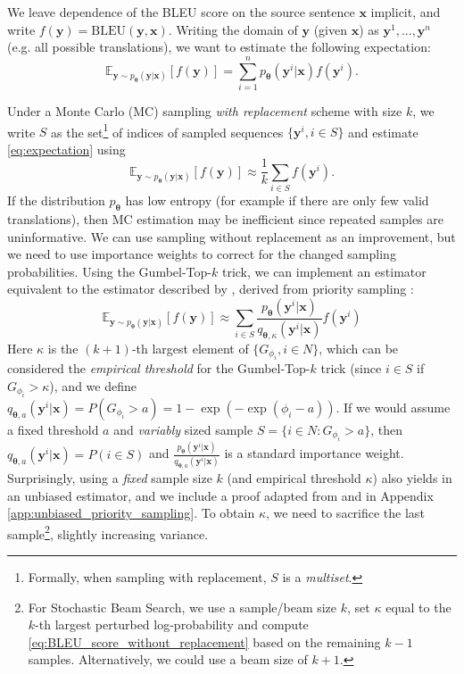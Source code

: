 We leave dependence of the BLEU score on the source sentence $\bm{x}$ implicit, and write $f(\bm{y}) = \text{BLEU}(\bm{y},\bm{x})$. Writing the domain of $\bm{y}$ (given $\bm{x}$) as $\bm{y}^1, ..., \bm{y}^n$ (e.g. all possible translations), we want to estimate the following expectation:
\begin{equation}
\label{eq:expectation}
    \mathbb{E}_{\bm{y} \sim p_{\bm{\theta}}(\bm{y}|\bm{x})} \left[f(\bm{y})\right] = \sum\limits_{i=1}^n p_{\bm{\theta}}(\bm{y}^i|\bm{x}) f(\bm{y}^i).
\end{equation}

Under a Monte Carlo (MC) sampling \emph{with replacement} scheme with size $k$, we write $S$ as the set\footnote{Formally, when sampling with replacement, $S$ is a \emph{multiset}.} of indices of sampled sequences $\{\bm{y}^i, i \in S\}$ and estimate \eqref{eq:expectation} using \begin{equation}
\label{eq:estimate_mc}
    \mathbb{E}_{\bm{y} \sim p_{\bm{\theta}}(\bm{y}|\bm{x})} \left[f(\bm{y})\right] \approx \frac{1}{k} \sum_{i \in S} f(\bm{y}^i).
\end{equation}
If the distribution $p_{\bm{\theta}}$ has low entropy (for example if there are only few valid translations), then MC estimation may be inefficient since repeated samples are uninformative. We can use sampling without replacement as an improvement, but we need to use importance weights to correct for the changed sampling probabilities. Using the Gumbel-Top-$k$ trick, we can implement an estimator equivalent to the estimator described by \citet{vieira2017estimating}, derived from priority sampling \citep{duffield2007priority}:
\begin{equation}
\label{eq:BLEU_score_without_replacement}
    \mathbb{E}_{\bm{y} \sim p_{\bm{\theta}}(\bm{y}|\bm{x})} \left[f(\bm{y})\right] \approx \sum_{i \in S}  \frac{p_{\bm{\theta}}(\bm{y}^i|\bm{x})}{q_{\bm{\theta},\kappa}(\bm{y}^i|\bm{x})}f(\bm{y}^i)
\end{equation}
Here $\kappa$ is the $(k+1)$-th largest element of $\{G_{\phi_i}, i \in N\}$, which can be considered the \emph{empirical threshold} for the Gumbel-Top-$k$ trick (since $i \in S$ if $G_{\phi_i} > \kappa$), and we define $q_{\bm{\theta},a}(\bm{y}^i|\bm{x}) = P(G_{\phi_i} > a) = 1 - \exp (-\exp(\phi_i - a))$.
If we would assume a fixed threshold $a$ and \emph{variably} sized sample $S = \{i \in N: G_{\phi_i} > a\}$, then $q_{\bm{\theta},a}(\bm{y}^i|\bm{x}) = P(i \in S)$ and $\frac{p_{\bm{\theta}}(\bm{y}^i|\bm{x})}{q_{\bm{\theta},a}(\bm{y}^i|\bm{x})}$ is a standard importance weight.
Surprisingly, using a \emph{fixed} sample size $k$ (and empirical threshold $\kappa$) also yields in an unbiased estimator, and we include a proof adapted from \citet{duffield2007priority} and \citet{vieira2017estimating} in Appendix \ref{app:unbiased_priority_sampling}. To obtain $\kappa$, we need to sacrifice the last sample\footnote{For Stochastic Beam Search, we use a sample/beam size $k$, set $\kappa$ equal to the $k$-th largest perturbed log-probability and compute \eqref{eq:BLEU_score_without_replacement} based on the remaining $k-1$ samples. Alternatively, we could use a beam size of $k + 1$.}, slightly increasing variance.

